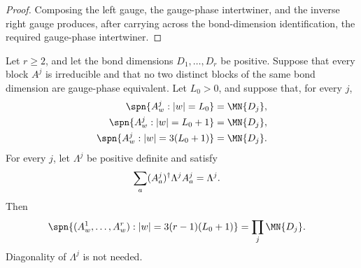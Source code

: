 \begin{proof}
    \leanok
    Composing the left gauge, the gauge-phase intertwiner, and the inverse right
    gauge produces, after carrying across the bond-dimension identification, the
    required gauge-phase intertwiner.
\end{proof}

\begin{lemma}
    \label{thm:pgvwc_prepared_gauge_product_span}
    \leanok
    Let $r\ge2$, and let the bond dimensions $D_1,\ldots,D_r$ be positive.
    Suppose that every block $A^j$ is irreducible and that no two distinct
    blocks of the same bond dimension are gauge-phase equivalent. Let $L_0>0$,
    and suppose
    that, for every $j$,
    \begin{align}
        \spn\{A^j_w:|w|=L_0\}
         & =\MN{D_j}, \notag \\
        \spn\{A^j_w:|w|=L_0+1\}
         & =\MN{D_j}, \notag \\
        \spn\{A^j_w:|w|=3(L_0+1)\}
         & =\MN{D_j}. \notag
    \end{align}
    For every $j$, let $\Lambda^j$ be positive definite and satisfy
    \begin{align}
        \sum_a(A^j_a)^\dagger\Lambda^jA^j_a & =\Lambda^j. \notag
    \end{align}
    Then
    \begin{align}
        \spn\{(A^1_w,\ldots,A^r_w):|w|=3(r-1)(L_0+1)\}
         & =\prod_j\MN{D_j}. \notag
    \end{align}
    Diagonality of $\Lambda^j$ is not needed.
\end{lemma}

